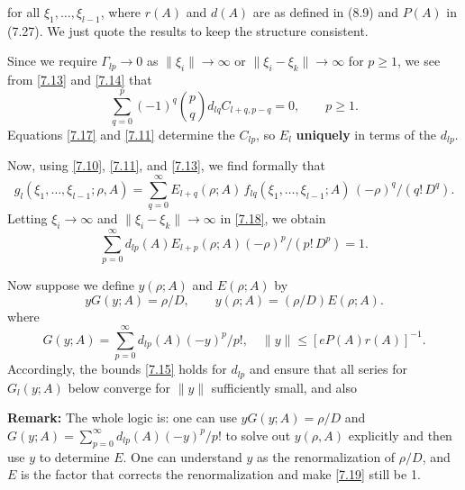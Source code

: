 \documentclass[11pt]{article}
\begin{document}
for all $\xi_1, \dots, \xi_{l-1}$, where $r(A)$ and $d(A)$ are as defined in
\cite{Morrey1955}{(8.9)} and $P(A)$ in \cite{Morrey1955}(7.27). We just quote the results to keep the structure consistent.

Since we require $\Gamma_{l p} \to 0$ as $\|\xi_i\|\to\infty$ or
$\|\xi_i - \xi_k\|\to\infty$ for $p\ge1$, we see from \eqref{7.13} and \eqref{7.14} that
\begin{equation}
\label{7.17}\tag{7.17}
\sum_{q=0}^{p}(-1)^q\binom{p}{q}d_{l q}C_{l+q, p-q} = 0, \qquad p \ge 1.
\end{equation}
Equations \eqref{7.17} and \eqref{7.11} determine the $C_{l p}$, so $E_l$ \textbf{uniquely} in terms of the
$d_{l p}$.

Now, using \eqref{7.10}, \eqref{7.11}, and \eqref{7.13}, we find formally that
\begin{equation}
\label{7.18}\tag{7.18}
g_l(\xi_1, \dots, \xi_{l-1}; \rho, A)
= \sum_{q=0}^{\infty}
  E_{l+q}(\rho; A)\,f_{l q}(\xi_1, \dots, \xi_{l-1}; A)\,
  (-\rho)^q/(q!\,D^q).
\end{equation}
Letting $\xi_i \to \infty$ and $\|\xi_i - \xi_k\| \to \infty$ in \eqref{7.18},
we obtain
\begin{equation}
\label{7.19}\tag{7.19}
\sum_{p=0}^{\infty}
  d_{l p}(A)E_{l+p}(\rho; A)(-\rho)^p/(p!\,D^p)
= 1.
\end{equation}

Now suppose we define $y(\rho; A)$ and $E(\rho; A)$ by
\begin{equation}
\label{7.20}\tag{7.20}
yG(y; A) = \rho/D, \qquad
y(\rho; A) = (\rho/D)E(\rho; A).
\end{equation}
where \begin{equation}
\label{7.16}\tag{7.16}
G(y; A) = \sum_{p=0}^{\infty} d_{l p}(A)(-y)^p/p!,
\quad
\|y\| \le [eP(A)r(A)]^{-1}.
\end{equation}
Accordingly, the bounds \eqref{7.15} holds for $d_{lp}$ and ensure that all
series for $G_l(y; A)$ below converge for $\|y\|$ sufficiently small, and also

\textbf{Remark:} The whole logic is: one can use $yG(y; A) = \rho/D$ and $G(y; A) = \sum_{p=0}^{\infty} d_{l p}(A)(-y)^p/p!$ to solve out $y(\rho,A)$ explicitly and then use $y$ to determine $E$. One can understand $y$ as the renormalization of $\rho/D$, and $E$ is the factor that corrects the renormalization and make \eqref{7.19} still be 1. 
\end{document}
